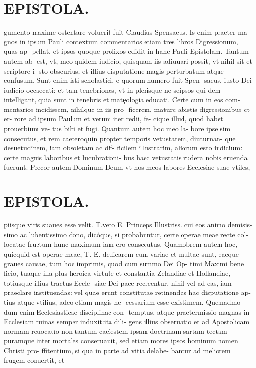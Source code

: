 \documentclass{article}
\begin{document}
\begin{pages}
\section*{EPISTOLA. }gumento maxime ostentare voluerit fuit Claudius Spensaeus. Is enim praeter ma- gnos in ipsum Pauli contextum commentarios etiam tres libros Digressionum, quas ap- pellat, et ipsos quoque prolixos edidit in hanc Pauli Epistolam. Tantum autem ab- est, vt, meo quidem iudicio, quisquam iis adiuuari possit, vt nihil sit et scriptore i- sto obscurius, et illius disputatione magis perturbatum atque confusum. Sunt enim isti scholastici, e quorum numero fuit Spen- saeus, iusto Dei iudicio occaecati: et tam tenebriones, vt in plerisque ne seipsos qui dem intelligant, quia sunt in tenebris et matȩologia educati. Certe cum in eos com- mentarios incidissem, nihilque in iis pro- ficerem, mature abistis digressionibus et er- rore ad ipsum Paulum et verum iter redii, fe- cique illud, quod habet prouerbium ve- tus bibi et fugi. Quantum autem hoc meo la- bore ipse sim consecutus, et rem caeteroquin propter temporis vetustatem, diuturnan- que desuetudinem, iam obsoletam ac dif- ficilem illustrarim, aliorum esto iudicium: certe magnis laboribus et lucubrationi- bus haec vetustatis rudera nobis eruenda fuerunt. Precor autem Dominum Deum vt hos meos labores Ecclesiae suae vtiles, 
\section*{EPISTOLA. }piisque viris suaues esse velit. T.vero E. Princeps Illustriss. cui eos animo demisis- simo ac lubentissimo dono, dicóque, si probabuntur, certe operae meae recte col- locatae fructum hunc maximum iam ero consecutus. Quamobrem autem hoc, quicquid est operae meae, T. E. dedicarem cum variae et multae sunt, eaeque graues causae, tum hoc imprimis, quod cum summo Dei Op- timi Maximi bene ficio, tuaque illa plus heroica virtute et constantia Zelandiae et Hollandiae, totiusque illius tractus Eccle- siae Dei pace recreentur, nihil vel ad eas, iam praeclare instituendas: vel quae erunt constitutae retinendas hac disputatione ap- tius atque vtilius, adeo etiam magis ne- cessarium esse existimem. Quemadmo- dum enim Ecclesiasticae disciplinae con- temptus, atque praetermissio magnas in Ecclesiam ruinas semper induxit:ita dili- gens illius obseruatio et ad Apostolicam normam reuocatio non tantum caelestem ipsam doctrinam sartam tectam puramque inter mortales conseruauit, sed etiam mores ipsos hominum nomen Christi pro- ffitentium, si qua in parte ad vitia delabe- bantur ad meliorem frugem conuertit, et 

\end{pages}
\end{document}
